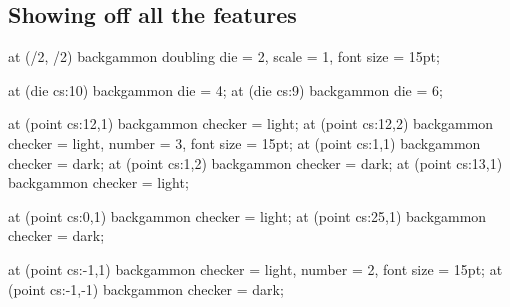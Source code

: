 \documentclass[14pt]{extarticle}
\begin{document}
  \subsection{Showing off all the features}
  
  \begin{backgammon}[%
    board width                = 15cm,
    board height               = 7.5cm,
    file height                = 3.5cm,
    file gap                   = 0.15cm,
    side column width          = 1.2cm,
    coordinates gap            = 0.3cm,
    coordinates font size      = 12pt,
    checker size               = 0.75cm,
    checker spacing            = 0.0cm,
    bar spacing                = 0.2cm,
    dark checker border color  = white,
    dark checker border width  = 0.5mm,
    light checker border width = 0.5mm,
    board background color     = backgammonLight,
    light file color           = black,
    dark file color            = backgammonDark,
    bar background color       = backgammonDark,
  ]
    \pic at (\bgLeftColWidth/2, \bgHeight/2) {backgammon doubling die = 2, scale = 1, font size = 15pt};
    
    \pic at (die cs:10) {backgammon die = 4};
    \pic at (die cs:9) {backgammon die = 6};

    \pic at (point cs:12,1) {backgammon checker = light};
    \pic at (point cs:12,2) {backgammon checker = light, number = 3, font size = 15pt};
    \pic at (point cs:1,1)  {backgammon checker = dark};
    \pic at (point cs:1,2)  {backgammon checker = dark};
    \pic at (point cs:13,1) {backgammon checker = light};
    
    \pic at (point cs:0,1) {backgammon checker = light};
    \pic at (point cs:25,1) {backgammon checker = dark};

    \pic at (point cs:-1,1)  {backgammon checker = light, number = 2, font size = 15pt};
    \pic at (point cs:-1,-1) {backgammon checker = dark};
  \end{backgammon}
\end{document}
